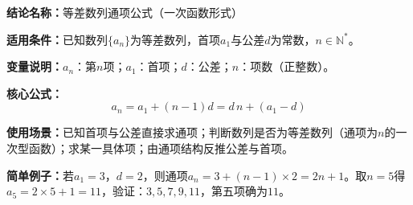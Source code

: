 \textbf{结论名称：}等差数列通项公式（一次函数形式）

\textbf{适用条件：}已知数列$\{a_n\}$为等差数列，首项$a_1$与公差$d$为常数，$n\in\mathbb{N}^*$。

\textbf{变量说明：}$a_n$：第$n$项；$a_1$：首项；$d$：公差；$n$：项数（正整数）。

\textbf{核心公式：}
\[
\boxed{a_n = a_1 + (n-1)d = d\,n + (a_1 - d)}
\]

\textbf{使用场景：}已知首项与公差直接求通项；判断数列是否为等差数列（通项为$n$的一次型函数）；求某一具体项；由通项结构反推公差与首项。

\textbf{简单例子：}若$a_1=3$，$d=2$，则通项$a_n = 3 + (n-1)\times 2 = 2n+1$。取$n=5$得$a_5 = 2\times5+1 = 11$，验证：$3,5,7,9,11$，第五项确为$11$。